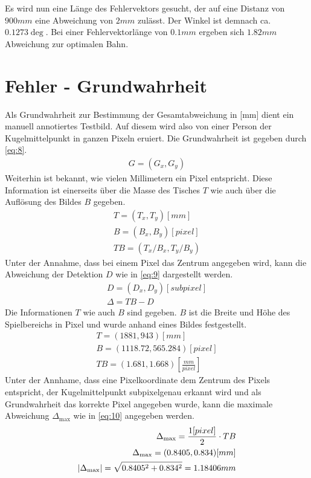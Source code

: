 Es wird nun eine Länge des Fehlervektors gesucht, der auf eine Distanz von $900mm$ eine Abweichung von $2mm$ zulässt.
Der Winkel ist demnach ca. $0.1273\deg$. Bei einer Fehlervektorlänge von $0.1mm$ ergeben sich $1.82mm$ Abweichung zur
optimalen Bahn.

\section{Fehler - Grundwahrheit}\label{anhang:fehler:grundwahrheit}
Als Grundwahrheit zur Bestimmung der Gesamtabweichung in [mm] dient ein manuell annotiertes Testbild.
Auf diesem wird also von einer Person der Kugelmittelpunkt in ganzen Pixeln eruiert. Die Grundwahrheit
ist gegeben durch \ref{eq:8}.
\begin{align}
    G = (G_x, G_y)\label{eq:8}
\end{align}
Weiterhin ist bekannt, wie vielen Millimetern ein Pixel entspricht. Diese Information ist einerseits über die Masse des
Tisches $T$ wie auch über die Auflösung des Bildes $B$ gegeben.
\begin{align}
    T = (T_x, T_y) [mm]\\
    B = (B_x, B_y) [pixel]\\
    TB = (T_x/B_x, T_y/B_y)
\end{align}
Unter der Annahme, dass bei einem Pixel das Zentrum angegeben wird, kann die Abweichung der Detektion $D$ wie in \ref{eq:9}
dargestellt werden.
\begin{align}
    D = (D_x, D_y) [subpixel]\\
    \Delta = TB - D\label{eq:9}
\end{align}
Die Informationen $T$ wie auch $B$ sind gegeben.
$B$ ist die Breite und Höhe des Spielbereichs in Pixel und wurde anhand eines Bildes festgestellt.
\begin{align}
    T = (1881, 943) [mm]\\
    B = (1118.72, 565.284) [pixel]\\
    TB = (1.681, 1.668) [\frac{mm}{pixel}]
\end{align}
Unter der Annhame, dass eine Pixelkoordinate dem Zentrum des Pixels entspricht, der Kugelmittelpunkt
subpixelgenau erkannt wird und als Grundwahrheit das korrekte Pixel angegeben wurde, kann die
maximale Abweichung $\Delta_{\max}$ wie in \ref{eq:10} angegeben werden.
\begin{align}
    \Delta_{\max} = \frac{1 [pixel]}{2} \cdot TB\label{eq:10}\\
    \Delta_{\max} = (0.8405, 0.834) [mm]\\
    \lvert \Delta_{\max} \rvert = \sqrt{0.8405^2 +  0.834^2} = 1.18406 mm
\end{align}
